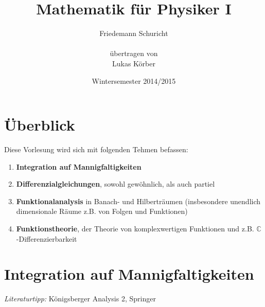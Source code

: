 \documentclass[a4paper,12pt,portrait]{book}
\title{Mathematik f\"ur Physiker I}
\author{Friedemann Schuricht\\ \\ \"ubertragen von\\Lukas K\"orber}
\date{Wintersemester 2014/2015}
\theoremstyle{theoremstyle}
\begin{document}
	\maketitle
\tableofcontents
\pagestyle{fancy}
\renewcommand{\thechapter}{\Roman{chapter}} 
\renewcommand*\thesection{\arabic{section}}
\renewcommand\theequation{\maybe{\arabic{chapter}}\arabic{section}.\arabic{equation}}
\DeclareRobustCommand\maybe[1]{\ifnum#1=\value{chapter}\relax\else\uppercase\expandafter{\romannumeral#1}.\fi}
\setcounter{chapter}{7}
\chapter*{Überblick}
Diese Vorlesung wird sich mit folgenden Tehmen befassen:
\begin{enumerate}
\item \textbf{Integration auf Mannigfaltigkeiten}
\item \textbf{Differenzialgleichungen}, sowohl gewöhnlich, als auch partiel
\item \textbf{Funktionalanalysis} in Banach- und Hilberträumen (insbesondere unendlich dimensionale Räume z.B. von Folgen und Funktionen)
\item \textbf{Funktionstheorie}, der Theorie von komplexwertigen Funktionen und z.B. $\mathbb{C}$-Differenzierbarkeit
\end{enumerate}

\chapter{Integration auf Mannigfaltigkeiten}
\emph{Literaturtipp:} Königsberger Analysis 2, Springer
\setcounter{section}{28}
\end{document}
